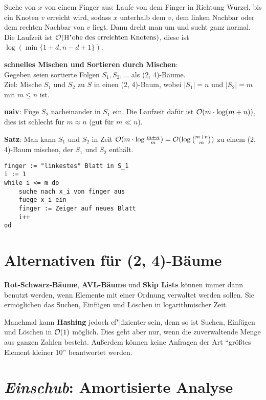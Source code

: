 Suche von $x$ von einem Finger aus:
Laufe von dem Finger in Richtung Wurzel, bis ein Knoten $v$ erreicht wird,
sodass $x$ unterhalb dem $v$, dem linken Nachbar oder dem rechten Nachbar
von $v$ liegt.
Dann dreht man um und sucht ganz normal. \\
Die Laufzeit ist $\mathcal{O}(\text{H"ohe des erreichten Knotens})$,
diese ist $\log(\min\{1 + d, n - d + 1\})$.

\linie

\textbf{schnelles Mischen und Sortieren durch Mischen}: \\
Gegeben seien sortierte Folgen $S_1, S_2, \dotsc$ als (2, 4)-Bäume. \\
Ziel: Mische $S_1$ und $S_2$ zu $S$ in einen (2, 4)-Baum,
wobei $|S_1| = n$ und $|S_2| = m$ mit $m \le n$ ist.

\textbf{naiv}:
Füge $S_2$ nacheinander in $S_1$ ein.
Die Laufzeit dafür ist $\mathcal{O}(m \cdot \log(m + n))$, dies ist schlecht für
$m \approx n$ (gut für $m \ll n$).

\textbf{Satz}:
Man kann $S_1$ und $S_2$ in Zeit
$\mathcal{O}(m \cdot \log \frac{m + n}{m}) = \mathcal{O}(\log \binom{m + n}{m})$ zu einem
(2, 4)-Baum mischen, der $S_1$ und $S_2$ enthält.

\begin{lstlisting}
finger := "linkestes" Blatt in S_1
i := 1
while i <= m do
    suche nach x_i von finger aus
    fuege x_i ein
    finger := Zeiger auf neues Blatt
    i++
od
\end{lstlisting}

\pagebreak

\section{%
    Alternativen für (2, 4)-Bäume%
}

\textbf{Rot-Schwarz-Bäume}, \textbf{AVL-Bäume} und \textbf{Skip Lists}
können immer dann benutzt werden, wenn Elemente mit einer Ordnung verwaltet
werden sollen.
Sie ermöglichen das Suchen, Einfügen und Löschen in logarithmischer Zeit.

Manchmal kann \textbf{Hashing} jedoch ef"|fizienter sein, denn so ist
Suchen, Einfügen und Löschen in $\mathcal{O}(1)$ möglich.
Dies geht aber nur, wenn die zuverwaltende Menge aus ganzen Zahlen besteht.
Außerdem können keine Anfragen der Art "`größtes Element kleiner $10$"'
beantwortet werden.

\section{%
    \emph{Einschub}: Amortisierte Analyse%
}

